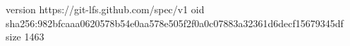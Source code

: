 version https://git-lfs.github.com/spec/v1
oid sha256:982bfcaaa0620578b54e0aa578e505f2f0a0c07883a32361d6decf15679345df
size 1463
